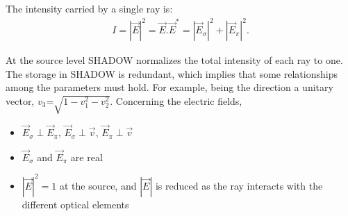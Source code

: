 \documentclass{iucr}
\begin{document}


The intensity carried by a single ray is:
\begin{eqnarray}
   I=|\vec{E}|^2 = \vec{E}.\vec{E}^* =
   |\vec{E}_\sigma|^2 + |\vec{E}_\pi|^2.
\end{eqnarray}

At the source level SHADOW normalizes the total intensity of each ray to one.
The storage in SHADOW is redundant, which implies that some relationships among the parameters must hold. For example, being the direction a unitary vector, $v_3\text{=}\sqrt{1-v_1^2-v_2^2}$. Concerning the electric fields,
\begin{itemize}
 \item $\vec{E}_\sigma \perp \vec{E}_\pi$, $\vec{E}_\sigma \perp \vec{v}$, $\vec{E}_\pi \perp \vec{v}$
 \item $\vec{E}_\sigma$ and $\vec{E}_\pi$ are real
 \item $|\vec{E}|^2=1$ at the source, and $|\vec{E}|$ is reduced as the ray interacts with the different
 optical elements
\end{itemize}
\end{document}
